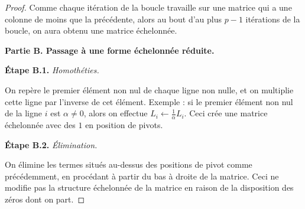 \documentclass[class=report,crop=false]{standalone}
\begin{document}
\begin{proof}
Comme chaque itération de la boucle travaille sur une matrice qui a
une colonne de moins que la précédente, alors au bout d'au
plus $p-1$ itérations de la boucle, on aura obtenu une
matrice échelonnée.

\bigskip

\textbf{Partie B. Passage à une forme échelonnée réduite.}

\textbf{\'Etape B.1.}  \emph{Homothéties.}

On repère le premier élément non nul de chaque ligne non nulle,
et on multiplie cette ligne par l'inverse de cet élément.
Exemple : si le premier élément non nul de la ligne $i$ est $\alpha\neq0$, alors
on effectue $L_i \leftarrow \frac1\alpha L_i$.
Ceci crée une matrice échelonnée avec des $1$ en position de pivots.


\medskip
\textbf{\'Etape B.2.}  \emph{\'Elimination.}

On élimine les termes situés au-dessus des positions de pivot
comme précédemment, en procédant à partir du bas à droite de la matrice.
Ceci ne modifie pas la structure échelonnée de la matrice en raison de
la disposition des zéros dont on part.

\end{proof}
\end{document}
